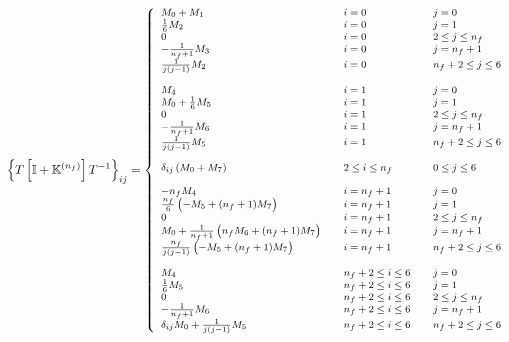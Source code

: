 \documentclass[10pt,a4paper]{article}
\begin{document}
\begin{equation}\label{eq:algorithmEv}
\footnotesize
\left\{T\left[\mathbb{I}+\mathbb{K}^{(n_f)}\right]T^{-1}\right\}_{ij} =
\left\{
\begin{array}{lll}
M_0+M_1 & \quad i = 0 &\quad j = 0\\
\frac{1}{6}M_2 & \quad i = 0 &\quad  j = 1\\
0 & \quad i = 0 &\quad  2\leq j \leq n_f\\
-\frac{1}{n_f+1}M_3 & \quad i = 0 &\quad  j = n_f+1\\
\frac{1}{j(j-1)}M_2 & \quad i = 0 &\quad  n_f+ 2\leq j \leq 6\\
\\
M_4 & \quad i = 1&\quad  j=0\\
M_0+\frac16 M_5 & \quad i = 1 &\quad  j=1\\
0 & \quad i = 1 &\quad  2\leq j \leq n_f\\
-\frac{1}{n_f+1}M_6 & \quad i = 1 &\quad  j = n_f+1\\
\frac{1}{j(j-1)}M_5 & \quad i = 1 &\quad  n_f+
                                                            2\leq j
                                                            \leq 6\\
\\
\delta_{ij}\left(M_0+M_7\right)&\quad 2\leq i \leq n_f &\quad 0\leq j
                                                         \leq 6\\
\\
-n_fM_4 &\quad i = n_f+1 &\quad j =0\\
\frac{n_f}6\left(-M_5+(n_f+1)M_7\right) &\quad i = n_f+1 &\quad j =1\\
0 & \quad i = n_f+1 &\quad  2\leq j \leq n_f\\
M_0+\frac1{n_f+1}\left(n_f M_6+(n_f+1)M_7\right) &\quad i = n_f+1 &\quad j =n_f+1\\
\frac{n_f}{j(j-1)}\left( -M_5+(n_f+1)M_7\right) &\quad i = n_f+1
                  &\quad n_f+2 \leq j \leq 6\\
\\
M_4 & \quad n_f+2\leq i \leq 6 &\quad  j=0\\
\frac16 M_5 & \quad n_f+2\leq i \leq 6 &\quad  j=1\\
0 & \quad n_f+2\leq i \leq 6 &\quad  2\leq j \leq n_f\\
-\frac{1}{n_f+1}M_6 & \quad n_f+2\leq i \leq 6 &\quad  j = n_f+1\\
\delta_{ij}M_0+\frac{1}{j(j-1)}M_5 & \quad n_f+2\leq i \leq 6 &\quad  n_f+
                                                            2\leq j
                                                            \leq 6\\
\end{array}
\right.
\end{equation}
\end{document}
